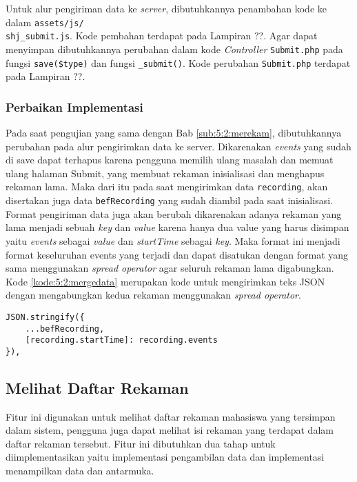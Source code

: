 Untuk alur pengiriman data ke \textit{server}, dibutuhkannya penambahan kode ke dalam \verb|assets/js/|\\\verb|shj_submit.js|. Kode pembahan terdapat pada Lampiran ??. Agar dapat menyimpan dibutuhkannya perubahan dalam kode \textit{Controller} \verb|Submit.php| pada fungsi \verb|save($type)| dan fungsi \verb|_submit()|. Kode perubahan \verb|Submit.php| terdapat pada Lampiran ??.

\subsubsection{Perbaikan Implementasi}

Pada saat pengujian yang sama dengan Bab \ref{sub:5:2:merekam}, dibutuhkannya perubahan pada alur pengirimkan data ke server. Dikarenakan \textit{events} yang sudah di save dapat terhapus karena pengguna memilih ulang masalah dan memuat ulang halaman Submit, yang membuat rekaman inisialisasi dan menghapus rekaman lama. Maka dari itu pada saat mengirimkan data \verb|recording|, akan disertakan juga data \verb|befRecording| yang sudah diambil pada saat inisialisasi. Format pengiriman data juga akan berubah dikarenakan adanya rekaman yang lama menjadi sebuah \textit{key} dan \textit{value} karena hanya dua value yang harus disimpan yaitu \textit{events} sebagai \textit{value} dan \textit{startTime} sebagai \textit{key}. Maka format ini menjadi format keseluruhan events yang terjadi dan dapat disatukan dengan format yang sama menggunakan \textit{spread operator} agar seluruh rekaman lama digabungkan. Kode \ref{kode:5:2:mergedata} merupakan kode untuk mengirimkan teks JSON dengan mengabungkan kedua rekaman menggunakan \textit{spread operator}.

\begin{lstlisting}[caption={\textit{object callback function}}, label={kode:5:2:mergedata}]
JSON.stringify({
    ...befRecording,
    [recording.startTime]: recording.events
}),
\end{lstlisting}

\subsection{Melihat Daftar Rekaman}

Fitur ini digunakan untuk melihat daftar rekaman mahasiswa yang tersimpan dalam sistem, pengguna juga dapat melihat isi rekaman yang terdapat dalam daftar rekaman tersebut. Fitur ini dibutuhkan dua tahap untuk diimplementasikan yaitu implementasi pengambilan data dan implementasi menampilkan data dan antarmuka.

